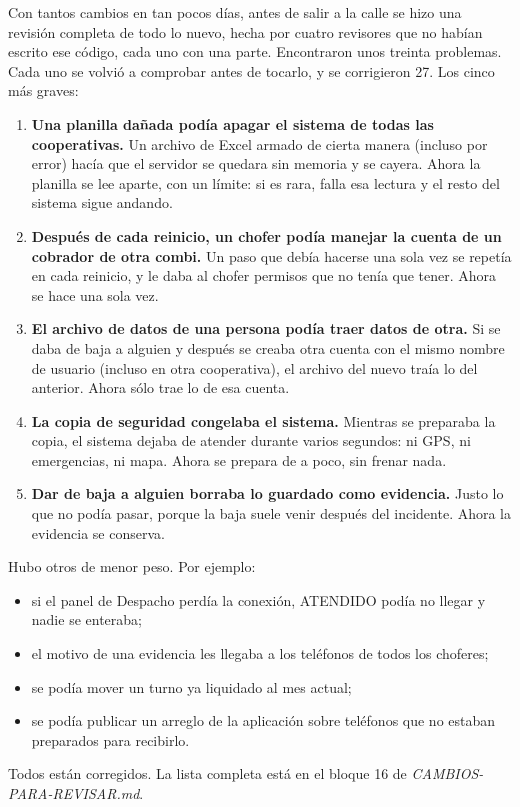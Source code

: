 \documentclass[12pt,a4paper]{article}
\begin{document}
Con tantos cambios en tan pocos días, antes de salir a la calle se hizo una
revisión completa de todo lo nuevo, hecha por cuatro revisores que no habían
escrito ese código, cada uno con una parte. Encontraron unos treinta
problemas. Cada uno se volvió a comprobar antes de tocarlo, y se corrigieron
27. Los cinco más graves:

\begin{enumerate}[leftmargin=1.5em]
  \item \textbf{Una planilla dañada podía apagar el sistema de todas las
  cooperativas.} Un archivo de Excel armado de cierta manera (incluso por
  error) hacía que el servidor se quedara sin memoria y se cayera. Ahora la
  planilla se lee aparte, con un límite: si es rara, falla esa lectura y el
  resto del sistema sigue andando.
  \item \textbf{Después de cada reinicio, un chofer podía manejar la cuenta de
  un cobrador de otra combi.} Un paso que debía hacerse una sola vez se
  repetía en cada reinicio, y le daba al chofer permisos que no tenía que
  tener. Ahora se hace una sola vez.
  \item \textbf{El archivo de datos de una persona podía traer datos de otra.}
  Si se daba de baja a alguien y después se creaba otra cuenta con el mismo
  nombre de usuario (incluso en otra cooperativa), el archivo del nuevo traía
  lo del anterior. Ahora sólo trae lo de esa cuenta.
  \item \textbf{La copia de seguridad congelaba el sistema.} Mientras se
  preparaba la copia, el sistema dejaba de atender durante varios segundos:
  ni GPS, ni emergencias, ni mapa. Ahora se prepara de a poco, sin frenar
  nada.
  \item \textbf{Dar de baja a alguien borraba lo guardado como evidencia.}
  Justo lo que no podía pasar, porque la baja suele venir después del
  incidente. Ahora la evidencia se conserva.
\end{enumerate}

Hubo otros de menor peso. Por ejemplo:
\begin{itemize}[leftmargin=1.2em]
  \item si el panel de Despacho perdía la conexión, ATENDIDO podía no llegar y
  nadie se enteraba;
  \item el motivo de una evidencia les llegaba a los teléfonos de todos los
  choferes;
  \item se podía mover un turno ya liquidado al mes actual;
  \item se podía publicar un arreglo de la aplicación sobre teléfonos que no
  estaban preparados para recibirlo.
\end{itemize}
Todos están corregidos. La lista completa está en el bloque 16 de
\emph{CAMBIOS-PARA-REVISAR.md}.
\end{document}
